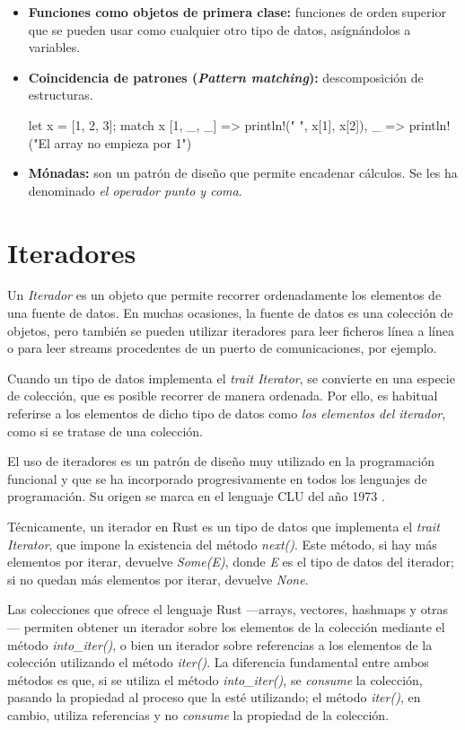 \begin{itemize}
   
   \item \textbf{Funciones como objetos de primera clase:} funciones de orden superior que se pueden usar como cualquier otro tipo de datos, asígnándolos a variables.
   \item \textbf{Coincidencia de patrones (\textit{Pattern matching}):} descomposición de estructuras.
   \begin{Codigo}
      let x = [1, 2, 3];
      match x {
         [1, _, _] => println!("{} {}", x[1], x[2]),
         _         => println!("El array no empieza por 1")
      }
   \end{Codigo}
   \item \textbf{Mónadas:} son un patrón de diseño que permite encadenar cálculos. Se les ha denominado \textit{el operador punto y coma}.
\end{itemize}

\section{Iteradores}
\label{sec_iteradorees}
Un \textit{Iterador} es un objeto que permite recorrer ordenadamente los elementos de una fuente de datos. En muchas ocasiones, la fuente de datos es una colección de objetos, pero también se pueden utilizar iteradores para leer ficheros línea a línea o para leer streams procedentes de un puerto de comunicaciones, por ejemplo.

Cuando un tipo de datos implementa el \textit{trait Iterator}, se convierte en una especie de colección, que es posible recorrer de manera ordenada. Por ello, es habitual referirse a los elementos de dicho tipo de datos como \textit{los elementos del iterador}, como si se tratase de una colección.

El uso de iteradores es un patrón de diseño muy utilizado en la programación funcional y que se ha incorporado progresivamente en todos los lenguajes de programación. Su origen se marca en el lenguaje CLU del año 1973 \citep{wikipediaCLUProgrammingLanguage2024}.

Técnicamente, un iterador en Rust es un tipo de datos que implementa el \textit{trait Iterator}, que impone la existencia del método \textit{next()}. Este método, si hay más elementos por iterar, devuelve \textit{Some(E)}, donde \textit{E} es el tipo de datos del iterador; si no quedan más elementos por iterar, devuelve \textit{None}.

Las colecciones que ofrece el lenguaje Rust ---arrays, vectores, hashmaps y otras--- permiten obtener un iterador sobre los elementos de la colección mediante el método \textit{into\_iter()}, o bien un iterador sobre referencias a los elementos de la colección utilizando el método \textit{iter()}. La diferencia fundamental entre ambos métodos es que, si se utiliza el método \textit{into\_iter()}, se \textit{consume} la colección, pasando la propiedad al proceso que la esté utilizando; el método \textit{iter()}, en cambio, utiliza referencias y no \textit{consume} la propiedad de la colección.

